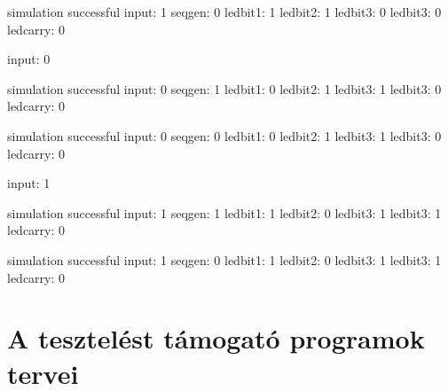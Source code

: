\begin{itemize}
simulation successful\newline
input: 1\newline
seqgen: 0\newline
ledbit1: 1\newline
ledbit2: 1\newline
ledbit3: 0\newline
ledbit3: 0\newline
ledcarry: 0\newline

input: 0\newline

simulation successful\newline
input: 0\newline
seqgen: 1\newline
ledbit1: 0\newline
ledbit2: 1\newline
ledbit3: 1\newline
ledbit3: 0\newline
ledcarry: 0\newline

simulation successful\newline
input: 0\newline
seqgen: 0\newline
ledbit1: 0\newline
ledbit2: 1\newline
ledbit3: 1\newline
ledbit3: 0\newline
ledcarry: 0\newline

input: 1\newline

simulation successful\newline
input: 1\newline
seqgen: 1\newline
ledbit1: 1\newline
ledbit2: 0\newline
ledbit3: 1\newline
ledbit3: 1\newline
ledcarry: 0\newline

simulation successful\newline
input: 1\newline
seqgen: 0\newline
ledbit1: 1\newline
ledbit2: 0\newline
ledbit3: 1\newline
ledbit3: 1\newline
ledcarry: 0\newline


\end{itemize}

\section{A tesztelést támogató programok tervei}

